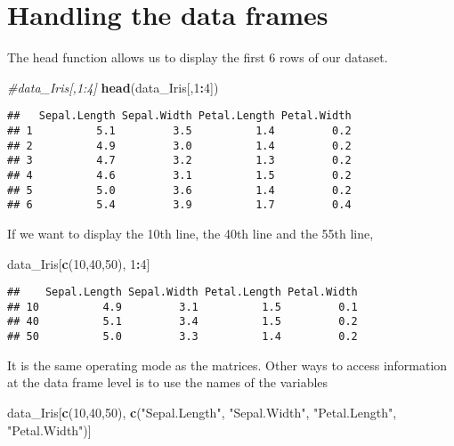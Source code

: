 \documentclass[
]{article}
\newenvironment{Shaded}{\begin{snugshade}}{\end{snugshade}}
\newcommand{\CommentTok}[1]{\textcolor[rgb]{0.56,0.35,0.01}{\textit{#1}}}
\newcommand{\DecValTok}[1]{\textcolor[rgb]{0.00,0.00,0.81}{#1}}
\newcommand{\FunctionTok}[1]{\textcolor[rgb]{0.13,0.29,0.53}{\textbf{#1}}}
\newcommand{\NormalTok}[1]{#1}
\newcommand{\SpecialCharTok}[1]{\textcolor[rgb]{0.81,0.36,0.00}{\textbf{#1}}}
\newcommand{\StringTok}[1]{\textcolor[rgb]{0.31,0.60,0.02}{#1}}
\begin{document}
\hypertarget{handling-the-data-frames}{%
\section{Handling the data frames}\label{handling-the-data-frames}}

The head function allows us to display the first 6 rows of our dataset.

\begin{Shaded}
\begin{Highlighting}[]
\CommentTok{\#data\_Iris[,1:4]}
\FunctionTok{head}\NormalTok{(data\_Iris[,}\DecValTok{1}\SpecialCharTok{:}\DecValTok{4}\NormalTok{])}
\end{Highlighting}
\end{Shaded}

\begin{verbatim}
##   Sepal.Length Sepal.Width Petal.Length Petal.Width
## 1          5.1         3.5          1.4         0.2
## 2          4.9         3.0          1.4         0.2
## 3          4.7         3.2          1.3         0.2
## 4          4.6         3.1          1.5         0.2
## 5          5.0         3.6          1.4         0.2
## 6          5.4         3.9          1.7         0.4
\end{verbatim}

If we want to display the 10th line, the 40th line and the 55th line,

\begin{Shaded}
\begin{Highlighting}[]
\NormalTok{data\_Iris[}\FunctionTok{c}\NormalTok{(}\DecValTok{10}\NormalTok{,}\DecValTok{40}\NormalTok{,}\DecValTok{50}\NormalTok{), }\DecValTok{1}\SpecialCharTok{:}\DecValTok{4}\NormalTok{]}
\end{Highlighting}
\end{Shaded}

\begin{verbatim}
##    Sepal.Length Sepal.Width Petal.Length Petal.Width
## 10          4.9         3.1          1.5         0.1
## 40          5.1         3.4          1.5         0.2
## 50          5.0         3.3          1.4         0.2
\end{verbatim}

It is the same operating mode as the matrices. Other ways to access
information at the data frame level is to use the names of the variables

\begin{Shaded}
\begin{Highlighting}[]
\NormalTok{data\_Iris[}\FunctionTok{c}\NormalTok{(}\DecValTok{10}\NormalTok{,}\DecValTok{40}\NormalTok{,}\DecValTok{50}\NormalTok{), }\FunctionTok{c}\NormalTok{(}\StringTok{"Sepal.Length"}\NormalTok{, }\StringTok{"Sepal.Width"}\NormalTok{, }\StringTok{"Petal.Length"}\NormalTok{, }\StringTok{"Petal.Width"}\NormalTok{)]}
\end{Highlighting}
\end{Shaded}
\end{document}
